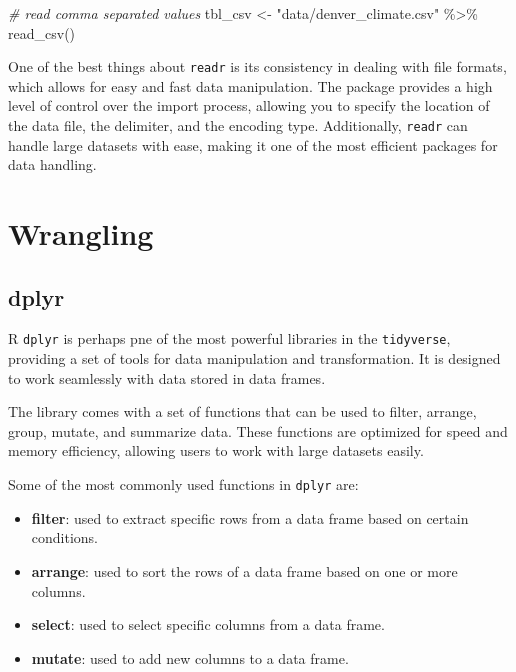 \documentclass[
]{book}
\newenvironment{Shaded}{\begin{snugshade}}{\end{snugshade}}
\newcommand{\CommentTok}[1]{\textcolor[rgb]{0.56,0.35,0.01}{\textit{#1}}}
\newcommand{\FunctionTok}[1]{\textcolor[rgb]{0.00,0.00,0.00}{#1}}
\newcommand{\NormalTok}[1]{#1}
\newcommand{\OtherTok}[1]{\textcolor[rgb]{0.56,0.35,0.01}{#1}}
\newcommand{\SpecialCharTok}[1]{\textcolor[rgb]{0.00,0.00,0.00}{#1}}
\newcommand{\StringTok}[1]{\textcolor[rgb]{0.31,0.60,0.02}{#1}}
\providecommand{\tightlist}{%
  \setlength{\itemsep}{0pt}\setlength{\parskip}{0pt}}
\begin{document}
\begin{Shaded}
\begin{Highlighting}[]
\CommentTok{\# read comma separated values}
\NormalTok{tbl\_csv }\OtherTok{\textless{}{-}} \StringTok{"data/denver\_climate.csv"} \SpecialCharTok{\%\textgreater{}\%} \FunctionTok{read\_csv}\NormalTok{()}
\end{Highlighting}
\end{Shaded}

One of the best things about \texttt{readr} is its consistency in dealing with file formats, which allows for easy and fast data manipulation. The package provides a high level of control over the import process, allowing you to specify the location of the data file, the delimiter, and the encoding type. Additionally, \texttt{readr} can handle large datasets with ease, making it one of the most efficient packages for data handling.

\hypertarget{wrangling}{%
\section{Wrangling}\label{wrangling}}

\hypertarget{dplyr}{%
\subsection{dplyr}\label{dplyr}}

R \texttt{dplyr} is perhaps pne of the most powerful libraries in the \texttt{tidyverse}, providing a set of tools for data manipulation and transformation. It is designed to work seamlessly with data stored in data frames.

The library comes with a set of functions that can be used to filter, arrange, group, mutate, and summarize data. These functions are optimized for speed and memory efficiency, allowing users to work with large datasets easily.

Some of the most commonly used functions in \texttt{dplyr} are:

\begin{itemize}
\tightlist
\item
  \textbf{filter}: used to extract specific rows from a data frame based on certain conditions.
\item
  \textbf{arrange}: used to sort the rows of a data frame based on one or more columns.
\item
  \textbf{select}: used to select specific columns from a data frame.
\item
  \textbf{mutate}: used to add new columns to a data frame.
\end{itemize}
\end{document}
